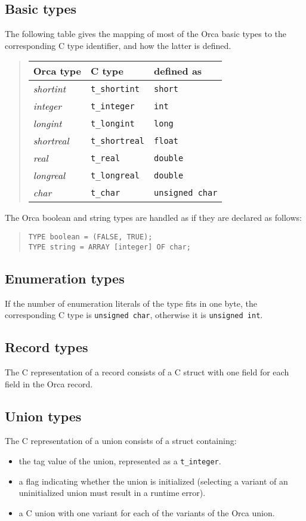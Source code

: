 \documentclass[10pt]{article}
\begin{document}
\subsection{Basic types}

The following table gives the mapping of most of the Orca basic types
to the corresponding C type identifier, and how the latter is
defined.

\begin{quote}
\begin{tabular}{|l|l|l|}\hline
{\bf Orca type} & {\bf C type} & {\bf defined as} \\ \hline
{\em shortint} & \verb+t_shortint+ & \verb+short+ \\
{\em integer} & \verb+t_integer+ & \verb+int+ \\
{\em longint} & \verb+t_longint+ & \verb+long+ \\
{\em shortreal} & \verb+t_shortreal+ & \verb+float+ \\
{\em real} & \verb+t_real+ & \verb+double+ \\
{\em longreal} & \verb+t_longreal+ & \verb+double+ \\
{\em char} & \verb+t_char+ & \verb+unsigned char+ \\ \hline
\end{tabular}
\end{quote}

The Orca boolean and string types are handled as if they are
declared as follows:
\begin{quote}
\begin{verbatim}
TYPE boolean = (FALSE, TRUE);
TYPE string = ARRAY [integer] OF char;
\end{verbatim}
\end{quote}

\subsection{Enumeration types}
If the number of enumeration literals of the type fits in one byte,
the corresponding C type is \verb+unsigned char+,
otherwise it is \verb+unsigned int+.

\subsection{Record types}
The C representation of a record consists of a C struct with one
field for each field in the Orca record.

\subsection{Union types}
The C representation of a union consists of a struct containing:
\begin{itemize}
\item
the tag value of the union, represented as a \verb+t_integer+.
\item
a flag indicating whether the union is initialized (selecting a variant
of an uninitialized union must result in a runtime error).
\item
a C union with one variant for each of the variants of the Orca union.
\end{itemize}
\end{document}

